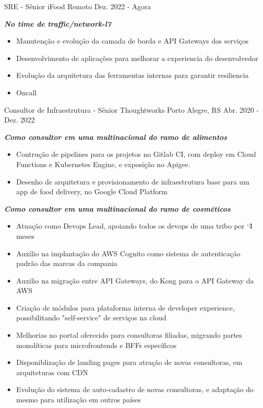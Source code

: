 \begin{cventries}
  \cventry
    {SRE - Sênior}
    {iFood}
    {Remoto}
    {Dez. 2022 - Agora}
    {
      \begin{cvitems}
        \item \textit{\textbf{No time de traffic/network-l7}}
        \begin{itemize}
          \item Manutenção e evolução da camada de borda e API Gateways dos serviços
          \item Desenvolvimento de aplicações para melhorar a experiencia do desenvolvedor
          \item Evolução da arquitetura das ferramentas internas para garantir resiliencia
          \item Oncall
        \end{itemize}
      \end{cvitems}
    }
  
  \cventry
    {Consultor de Infraestrutura - Sênior}
    {Thoughtworks}
    {Porto Alegre, RS}
    {Abr. 2020 - Dez. 2022}
    {
      \begin{cvitems}
        \item \textit{\textbf{Como consultor em uma multinacional do ramo de alimentos}}
        \begin{itemize}
            \item Contrução de pipelines para os projetos no Gitlab CI, com deploy em Cloud Functions e Kubernetes Engine, e exposição no Apigee.
            \item Desenho de arquitetura e provisionamento de infraestrutura base para um app de food delivery, no Google Cloud Platform
        \end{itemize}
        \item \textit{\textbf{Como consultor em uma multinacional do ramo de cosméticos}}
        \begin{itemize}
            \item Atuação como Devops Lead, apoiando todos os devops de uma tribo por \char`\~ 4 meses
            \item Auxilio na implantação do AWS Cognito como sistema de autenticação padrão das marcas da compania
            \item Auxilio na migração entre API Gateways, do Kong para o API Gateway da AWS
            \item Criação de módulos para plataforma interna de developer experience, possibilitando "self-service" de serviços na cloud
            \item Melhorias no portal oferecido para consultoras filiadas, migrando partes monolíticas para microfrontends e BFFs específicos
            \item Disponiblização de landing pages para atração de novas consultoras, em arquiteturas com CDN
            \item Evolução do sistema de auto-cadastro de novas consultoras, e adaptação do mesmo para utilização em outros países
        \end{itemize}
      \end{cvitems}
    }
    

\end{cventries}
